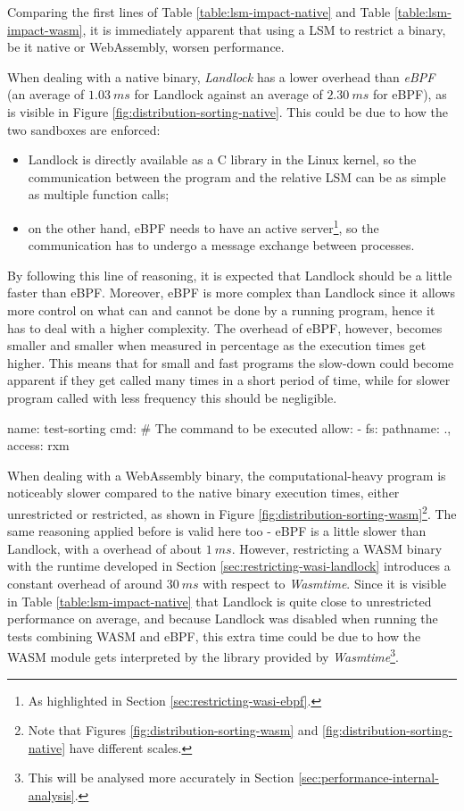 Comparing the first lines of Table \ref{table:lsm-impact-native} and Table \ref{table:lsm-impact-wasm},
it is immediately apparent that using a LSM to restrict a binary, be it native or WebAssembly, worsen performance.

When dealing with a native binary, \textit{Landlock} has a lower overhead than \textit{eBPF} (an average
of $1.03\ ms$ for Landlock against an average of $2.30\ ms$ for eBPF), as is visible in Figure \ref{fig:distribution-sorting-native}.
This could be due to how the two sandboxes are enforced:
\begin{itemize}
  \item Landlock is directly available as a C library in the Linux kernel, so the communication between
        the program and the relative LSM can be as simple as multiple function calls;
  \item on the other hand, eBPF needs to have an active server\footnote{As highlighted in Section \ref{sec:restricting-wasi-ebpf}.},
        so the communication has to undergo a message exchange between processes.
\end{itemize}
By following this line of reasoning, it is expected that Landlock should be a little faster than eBPF.
Moreover, eBPF is more complex than Landlock since it allows more control on what
can and cannot be done by a running program, hence it has to deal with a higher complexity.
The overhead of eBPF, however, becomes smaller and smaller when measured in percentage as the execution times get higher.
This means that for small and fast programs the slow-down could become apparent if they get called many times
in a short period of time, while for slower program called with less frequency this should be negligible.

\vspace*{0.5cm}
\begin{code}[language=yaml, caption=The outline of the policy used for testing the sorting program., label=lst:outline-policy-sorting-test]
name: test-sorting
cmd: # The command to be executed
allow:
- fs: {pathname: ., access: rxm}
\end{code}

When dealing with a WebAssembly binary, the computational-heavy program is noticeably slower
compared to the native binary execution times, either unrestricted or restricted, as shown in Figure
\ref{fig:distribution-sorting-wasm}\footnote{Note that Figures \ref{fig:distribution-sorting-wasm} and \ref{fig:distribution-sorting-native}
have different scales.}.
The same reasoning applied before is valid here too - eBPF is a little slower than Landlock, with a overhead
of about $1\ ms$.
However, restricting a WASM binary with the runtime developed in Section \ref{sec:restricting-wasi-landlock}
introduces a constant overhead of around $30\ ms$ with respect to \textit{Wasmtime}.
Since it is visible in Table \ref{table:lsm-impact-native} that Landlock is quite close to
unrestricted performance on average, and because Landlock was disabled when running
the tests combining WASM and eBPF, this extra time could be due to how the WASM module gets
interpreted by the library provided by \textit{Wasmtime}\footnote{This will be analysed more
accurately in Section \ref{sec:performance-internal-analysis}.}.

